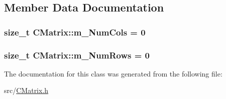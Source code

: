 \subsection{Member Data Documentation}
\subsubsection[{\texorpdfstring{m\+\_\+\+Num\+Cols}{m_NumCols}}]{\setlength{\rightskip}{0pt plus 5cm}size\+\_\+t C\+Matrix\+::m\+\_\+\+Num\+Cols = 0}\hypertarget{classCMatrix_a672c792e0f63bd7d5149f737e21d6abc}{}\label{classCMatrix_a672c792e0f63bd7d5149f737e21d6abc}
\subsubsection[{\texorpdfstring{m\+\_\+\+Num\+Rows}{m_NumRows}}]{\setlength{\rightskip}{0pt plus 5cm}size\+\_\+t C\+Matrix\+::m\+\_\+\+Num\+Rows = 0}\hypertarget{classCMatrix_affdcac23fd59da78e6e3902a32f48da3}{}\label{classCMatrix_affdcac23fd59da78e6e3902a32f48da3}


The documentation for this class was generated from the following file\+:\begin{DoxyCompactItemize}
\item 
src/\hyperlink{CMatrix_8h}{C\+Matrix.\+h}\end{DoxyCompactItemize}
